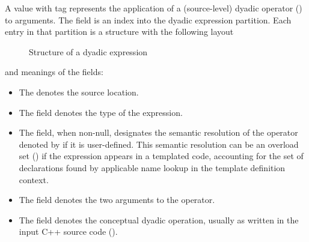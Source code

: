 A  value with tag  represents the application of a (source-level) dyadic operator () to arguments.
The  field is an index into the dyadic expression partition.
Each entry in that partition is a structure with the following layout
%
\begin{figure}[H]
	\centering
	\caption{Structure of a dyadic expression}
	\label{fig:ifc-dyadic-expression-structure}
\end{figure}
%
and meanings of the fields:
\begin{itemize}
	\item The  denotes the source location.
	\item The  field denotes the type of the expression.
	\item The  field, when non-null, designates the semantic resolution of the operator denoted by  
	if it is user-defined. This semantic resolution can be an overload set () if the expression 
	appears in a templated code, accounting for the set of declarations found by applicable name lookup in the template definition context.
	\item The  field denotes the two arguments to the operator.
	\item The  field denotes the conceptual dyadic operation, usually as written in the input C++ source code
	().
\end{itemize}


\subsection{}
\label{sec:ifc:ExprSort:Triad}

